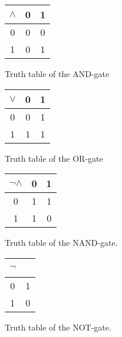 \usetikzlibrary{arrows,positioning}
\begin{multicols}{4}
	
	\begin{figure}[H]
		\center
%			
%			
		\begin{tabular}{c|cc}
			$\land$ & 0 & 1 \\ \hline
			0 & 0 & 0 \\
			1 & 0 & 1
		\end{tabular}
		\label{table:and-gate}
		\caption{Truth table of the AND-gate}
	\end{figure}
	
	\vfill
	\columnbreak
			
	\begin{figure}[H]
		\center
		\begin{tabular}{c|cc}
			$\lor$ & 0 & 1 \\ \hline
			0 & 0 & 1 \\
			1 & 1 & 1
		\end{tabular}
		\label{table:or-gate}
		\caption{Truth table of the OR-gate}
	\end{figure}
	
	\vfill
	\columnbreak

	\begin{figure}[H]
		\center
		\begin{tabular}{c|cc}
			$\neg\land$ & 0 & 1 \\ \hline
			0 & 1 & 1 \\
			1 & 1 & 0
		\end{tabular}
		\label{table:nand-gate}
		\caption{Truth table of the NAND-gate.}
	\end{figure}
	
	\vfill
	\columnbreak

	\begin{figure}[H]
		\center
		\begin{tabular}{c|c}
			$\neg$ & {\ } \\ \hline
			0 & 1 \\
			1 & 0
		\end{tabular}
		\label{table:not-gate}
		\caption{Truth table of the NOT-gate.}
	\end{figure}
	
\end{multicols}

